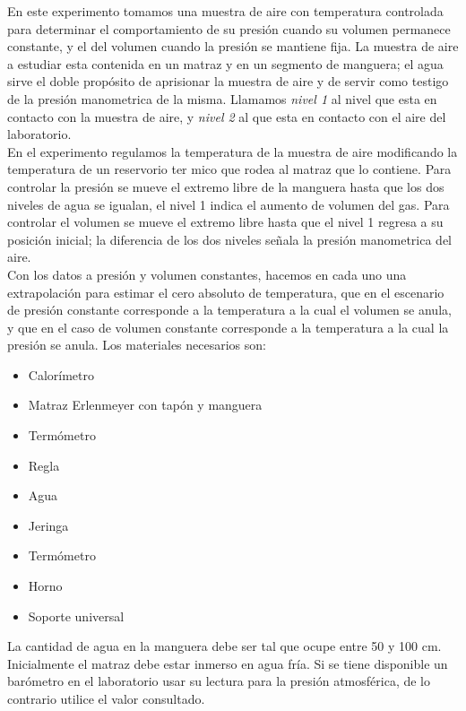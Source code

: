 \documentclass[DIV=calc, paper=a4, fontsize=11pt, twocolumn, spanish]{scrartcl}	 %
\begin{document}
En este experimento tomamos una muestra de aire con temperatura controlada para determinar el comportamiento de su presión cuando su volumen permanece constante, y el del volumen cuando la presión se mantiene fija. La muestra de aire a estudiar esta contenida en un matraz y en un segmento de manguera; el agua sirve el doble propósito de aprisionar la muestra de aire y de servir como testigo de la presión manometrica de la misma. Llamamos \textit{nivel 1} al nivel que esta en contacto con la muestra de aire, y \textit{nivel 2} al que esta en contacto con el aire del laboratorio.\\

En el experimento regulamos la temperatura de la muestra de aire modificando la temperatura de un reservorio ter mico que rodea al matraz que lo contiene. Para controlar la presión se mueve el extremo libre de la manguera hasta que los dos niveles de agua se igualan, el nivel 1 indica el aumento de volumen del gas. Para controlar el volumen se mueve el extremo libre hasta que el nivel 1 regresa a su posición inicial; la diferencia de los dos niveles señala la presión manometrica del aire.\\

Con los datos a presión y volumen constantes, hacemos en cada uno una extrapolación para estimar el cero absoluto de temperatura, que en el escenario de presión constante corresponde a la temperatura a la cual el volumen se anula, y que en el caso de volumen constante corresponde a la temperatura a la cual la presión se anula. Los materiales necesarios son:

\begin{itemize}
\item Calorímetro
\item Matraz Erlenmeyer con tapón y manguera
\item Termómetro
\item Regla
\item Agua
\item Jeringa
\item Termómetro
\item Horno
\item Soporte universal
\end{itemize}

La cantidad de agua en la manguera debe ser tal que ocupe entre 50 y 100 cm. Inicialmente el matraz debe estar inmerso en agua fría. Si se tiene disponible un barómetro en el laboratorio usar su lectura para la presión atmosférica, de lo contrario utilice el valor consultado.\\
\end{document}
